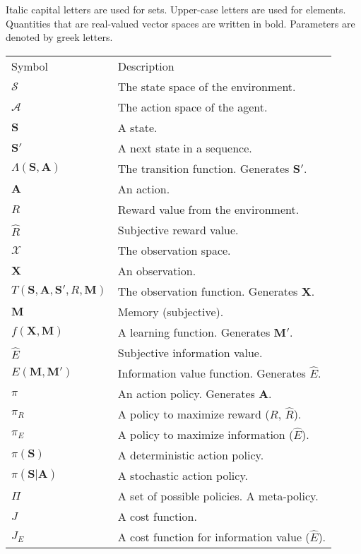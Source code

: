 Italic capital letters are used for sets. Upper-case letters are used for elements. Quantities that are real-valued vector spaces are written in bold. Parameters are denoted by greek letters.

\begin{table}[]
    \begin{tabular}{ll}
    Symbol & Description \\
    $\mathcal{S}$ & The state space of the environment. \\
    $\mathcal{A}$ & The action space of the agent. \\
    $\mathbf{S}$ & A state. \\
    $\mathbf{S'}$ & A next state in a sequence. \\
    $\Lambda(\mathbf{S},\mathbf{A})$ & The transition function. Generates $\mathbf{S'}$. \\
    $\mathbf{A}$ & An action. \\
    $R$ & Reward value from the environment. \\
    $\hat R$ & Subjective reward value. \\
    $\mathcal{X}$ & The observation space. \\
    $\mathbf{X}$ & An observation. \\
    $T(\mathbf{S},\mathbf{A},\mathbf{S'},R,\mathbf{M})$ & The observation function. Generates $\mathbf{X}$. \\
    $\mathbf{M}$ & Memory (subjective). \\
    $f(\mathbf{\mathbf{X},M})$ & A learning function. Generates $\mathbf{M'}$. \\
    $\hat E$ & Subjective information value. \\
    $E(\mathbf{M},\mathbf{M'})$ & Information value function. Generates $\hat E$. \\
    $\pi$ & An action policy. Generates $\mathbf{A}$. \\
    $\pi_R$ & A policy to maximize reward ($R$, $\hat R$). \\
    $\pi_E$ & A policy to maximize information ($\hat E$). \\
    $\pi(\mathbf{S})$ & A deterministic action policy. \\
    $\pi(\mathbf{S}|\mathbf{A})$ & A stochastic action policy. \\
    $\Pi$ & A set of possible policies. A meta-policy. \\
    $J$ & A cost function. \\
    $J_E$ & A cost function for information value ($\hat E$). \\

\end{tabular}
\end{table}

